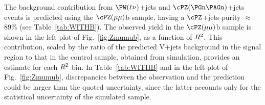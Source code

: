 The background contribution from $\PW(\ell \nu)$+jets and $\cPZ(\PGn\PAGn)$+jets events is predicted using the $\cPZ(\mu\mu)$b sample,
having a $\cPZ$+jets purity ${\approx}$89\% (see
Table~\ref{tab:WITHB}). The observed yield in the $\cPZ(\mu\mu)$b
sample is shown in the left plot of Fig.~\ref{fig:Zmumub}, as a
function of $R^2$. This contribution, scaled by the ratio of the predicted V+jets background in the signal region to that in the control sample, obtained from simulation, provides an
estimate for each $R^2$ bin. In Table~\ref{tab:WITHB}  and
in the left plot of Fig.~\ref{fig:Zmumub}, discrepancies between the observation and the prediction could be
larger than the quoted uncertainty, since the latter accounts only for the
statistical uncertainty of the simulated sample.


\begin{table}
\centering
{}
\end{table}


